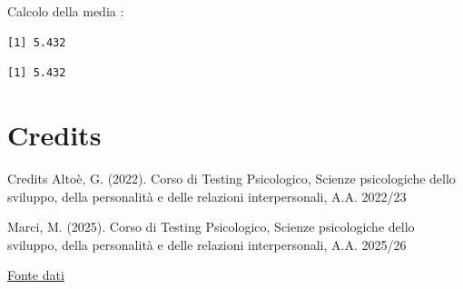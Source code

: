 \documentclass[
  ignorenonframetext,
  compress, aspectratio=149]{beamer}
\newenvironment{Shaded}{\begin{snugshade}}{\end{snugshade}}
\newcommand{\CommentTok}[1]{\textcolor[rgb]{0.56,0.35,0.01}{\textit{#1}}}
\newcommand{\FunctionTok}[1]{\textcolor[rgb]{0.13,0.29,0.53}{\textbf{#1}}}
\newcommand{\NormalTok}[1]{#1}
\newcommand{\OtherTok}[1]{\textcolor[rgb]{0.56,0.35,0.01}{#1}}
\newcommand{\SpecialCharTok}[1]{\textcolor[rgb]{0.81,0.36,0.00}{\textbf{#1}}}
\begin{document}
\begin{frame}[fragile]
Calcolo della media :

\begin{Shaded}
\end{Shaded}

\begin{verbatim}
[1] 5.432
\end{verbatim}

\begin{Shaded}
\end{Shaded}

\begin{verbatim}
[1] 5.432
\end{verbatim}
\end{frame}

\section{Credits}\label{credits}

\begin{frame}{Credits}
Altoè, G. (2022). Corso di Testing Psicologico, Scienze psicologiche
dello sviluppo, della personalità e delle relazioni interpersonali, A.A.
2022/23

Marci, M. (2025). Corso di Testing Psicologico, Scienze psicologiche
dello sviluppo, della personalità e delle relazioni interpersonali, A.A.
2025/26

\href{https://www.kaggle.com/datasets/ankam6010/synthetic-hr-burnout-dataset/data}{Fonte
dati}
\end{frame}
\end{document}
